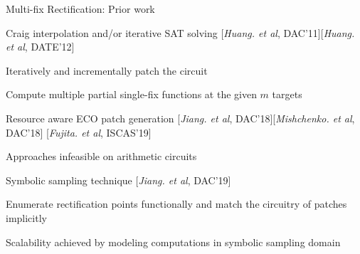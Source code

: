 \begin{frame}{\large Multi-fix Rectification: Prior work}

% 
\bi
\item Craig interpolation and/or iterative SAT solving [{\it Huang. et al}, DAC'11][{\it Huang. et al}, DATE'12]
\bi
	\item Iteratively and incrementally patch the circuit
	\item Compute multiple partial single-fix functions at the given $m$ targets
\ei
\item Resource aware ECO patch generation [{\it Jiang. et al}, DAC'18][{\it Mishchenko. et al}, DAC'18]
		[{\it Fujita. et al}, ISCAS'19]
\item Approaches infeasible on arithmetic circuits
\item Symbolic sampling technique [{\it Jiang. et al}, DAC'19]
\bi
	\item Enumerate rectification points functionally and match the circuitry of patches implicitly
	\item Scalability achieved by modeling computations in symbolic sampling domain
\ei
\ei
\end{frame}


